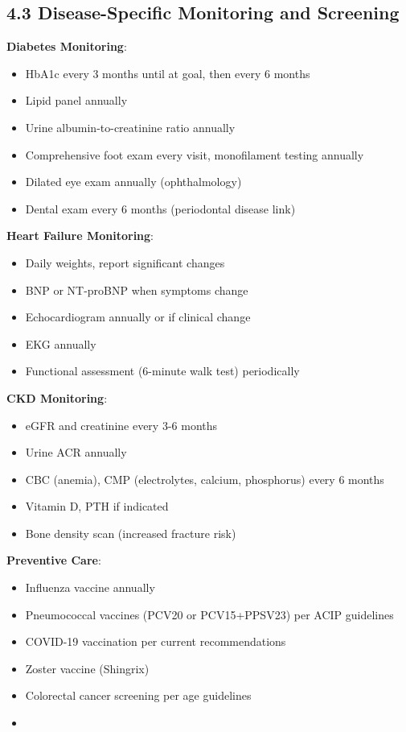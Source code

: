 \documentclass[11pt,letterpaper]{article}
\begin{document}
\subsection*{4.3 Disease-Specific Monitoring and Screening}

\textbf{Diabetes Monitoring}:
\begin{itemize}[leftmargin=*]
    \item HbA1c every 3 months until at goal, then every 6 months
    \item Lipid panel annually
    \item Urine albumin-to-creatinine ratio annually
    \item Comprehensive foot exam every visit, monofilament testing annually
    \item Dilated eye exam annually (ophthalmology)
    \item Dental exam every 6 months (periodontal disease link)
\end{itemize}

\textbf{Heart Failure Monitoring}:
\begin{itemize}[leftmargin=*]
    \item Daily weights, report significant changes
    \item BNP or NT-proBNP when symptoms change
    \item Echocardiogram annually or if clinical change
    \item EKG annually
    \item Functional assessment (6-minute walk test) periodically
\end{itemize}

\textbf{CKD Monitoring}:
\begin{itemize}[leftmargin=*]
    \item eGFR and creatinine every 3-6 months
    \item Urine ACR annually
    \item CBC (anemia), CMP (electrolytes, calcium, phosphorus) every 6 months
    \item Vitamin D, PTH if indicated
    \item Bone density scan (increased fracture risk)
\end{itemize}

\textbf{Preventive Care}:
\begin{itemize}[leftmargin=*]
    \item Influenza vaccine annually
    \item Pneumococcal vaccines (PCV20 or PCV15+PPSV23) per ACIP guidelines
    \item COVID-19 vaccination per current recommendations
    \item Zoster vaccine (Shingrix)
    \item Colorectal cancer screening per age guidelines
    \item [Other age/sex-appropriate screenings]
\end{itemize}
\end{document}
